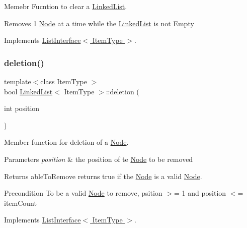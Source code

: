 Memebr Fucntion to clear a \hyperlink{classLinkedList}{Linked\+List}. 

Removes 1 \hyperlink{classNode}{Node} at a time while the \hyperlink{classLinkedList}{Linked\+List} is not Empty 

Implements \hyperlink{classListInterface_adfda414908b645bdf19bcab8269168b7}{List\+Interface$<$ Item\+Type $>$}.

\mbox{\label{classLinkedList_a7dc3cca217b45c6fe5d28c9d16b7bf9e}} 
\subsubsection{\texorpdfstring{deletion()}{deletion()}}
{\footnotesize\ttfamily template$<$class Item\+Type $>$ \\
bool \hyperlink{classLinkedList}{Linked\+List}$<$ Item\+Type $>$\+::deletion (\begin{DoxyParamCaption}\item[{int}]{position }\end{DoxyParamCaption})\hspace{0.3cm}{\ttfamily [virtual]}}



Member function for deletion of a \hyperlink{classNode}{Node}. 


\begin{DoxyParams}{Parameters}
{\em position} & the position of te \hyperlink{classNode}{Node} to be removed \\
\hline
\end{DoxyParams}
\begin{DoxyReturn}{Returns}
able\+To\+Remove returns true if the \hyperlink{classNode}{Node} is a valid \hyperlink{classNode}{Node}. 
\end{DoxyReturn}
\begin{DoxyPrecond}{Precondition}
To be a valid \hyperlink{classNode}{Node} to remove, psition $>$= 1 and position $<$= item\+Count 
\end{DoxyPrecond}


Implements \hyperlink{classListInterface_a68520ce2942ec716c745b1137c50a3c6}{List\+Interface$<$ Item\+Type $>$}.

\mbox{\label{classLinkedList_a65fb58d9f9b8af41e9569d1dc3200583}} 
